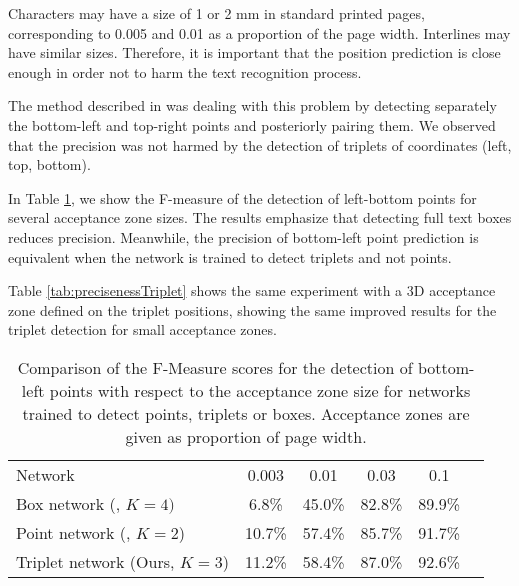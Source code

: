 \documentclass[conference]{IEEEtran}
\begin{document}
Characters may have a size of 1 or 2 mm in standard printed pages, corresponding to 0.005 and 0.01 as a proportion of the page width. Interlines may have similar sizes. Therefore, it is important that the position prediction is close enough in order not to harm the text recognition process.

The method described in \cite{moysset2016points} was dealing with this problem by detecting separately the bottom-left and top-right points and posteriorly pairing them. We observed that the precision was not harmed by the detection of triplets of coordinates (left, top, bottom).

In Table \ref{tab:precisenessPoint}, we show the F-measure of the detection of left-bottom points for several acceptance zone sizes. The results emphasize that detecting full text boxes reduces precision. Meanwhile, the precision of bottom-left point prediction is equivalent when the network is trained to detect triplets and not points.

Table \ref{tab:precisenessTriplet} shows the same experiment with a 3D acceptance zone defined on the triplet positions, showing the same improved results for the triplet detection for small acceptance zones.



\begin{table}
\begin{center}
\caption{Comparison of the F-Measure scores for the detection of bottom-left points with respect to the acceptance zone size for networks trained to detect points, triplets or boxes. Acceptance zones are given as proportion of page width.}
\label{tab:precisenessPoint}
\begin{tabular}{lccccc}
Network & 0.003 & 0.01  & 0.03 &  0.1  \\ %
\arrayrulecolor{cwblue1} \toprule
Box network (\cite{moysset2016learning}, $K{=}4)$ & 6.8\% & 45.0\% & 82.8\% & 89.9\% \\ %
Point network (\cite{moysset2016points}, $K{=}2$) & 10.7\% & 57.4\% & 85.7\% & 91.7\% \\ %
Triplet network (Ours, $K{=}3$) & 11.2\% & 58.4\% & 87.0\% & 92.6\% \\ %
\end{tabular}
\end{center}
\end{table}
\end{document}
